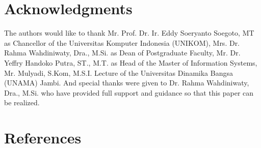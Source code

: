 \documentclass[12pt,a4paper,final]{iopart}
\begin{document}
\section*{Acknowledgments}
The authors would like to thank Mr. Prof. Dr. Ir. Eddy Soeryanto Soegoto, MT as Chancellor of the Universitas Komputer Indonesia (UNIKOM), Mrs. Dr. Rahma Wahdiniwaty, Dra., M.Si. as Dean of Postgraduate Faculty,  Mr. Dr. Yeffry Handoko Putra, ST., M.T. as Head of the Master of Information Systems, Mr. Mulyadi, S.Kom, M.S.I. Lecture of the Universitas Dinamika Bangsa (UNAMA) Jambi. And special thanks were given to Dr. Rahma Wahdiniwaty, Dra., M.Si. who have provided full support and guidance so that this paper can be realized. 


\section*{References}




\end{document}
